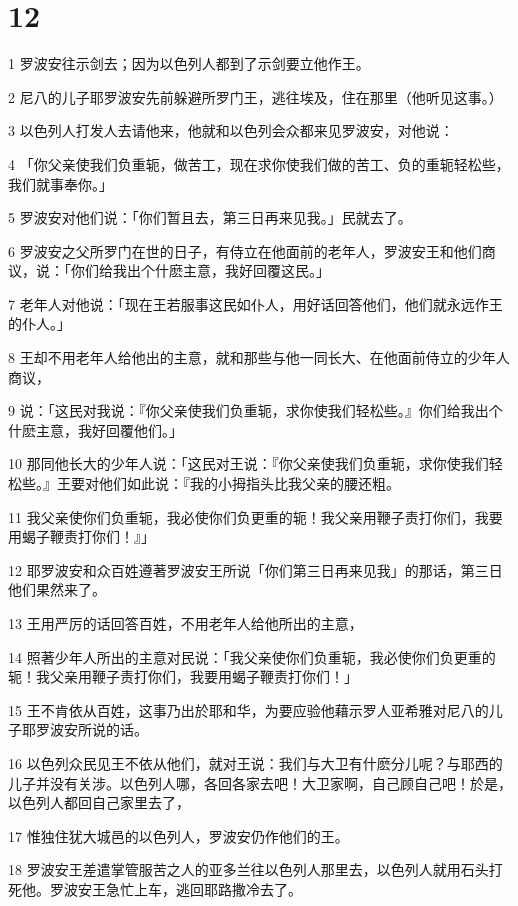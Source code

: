 \chapter{12}

\par 1 罗波安往示剑去；因为以色列人都到了示剑要立他作王。
\par 2 尼八的儿子耶罗波安先前躲避所罗门王，逃往埃及，住在那里（他听见这事。）
\par 3 以色列人打发人去请他来，他就和以色列会众都来见罗波安，对他说：
\par 4 「你父亲使我们负重轭，做苦工，现在求你使我们做的苦工、负的重轭轻松些，我们就事奉你。」
\par 5 罗波安对他们说：「你们暂且去，第三日再来见我。」民就去了。
\par 6 罗波安之父所罗门在世的日子，有侍立在他面前的老年人，罗波安王和他们商议，说：「你们给我出个什麽主意，我好回覆这民。」
\par 7 老年人对他说：「现在王若服事这民如仆人，用好话回答他们，他们就永远作王的仆人。」
\par 8 王却不用老年人给他出的主意，就和那些与他一同长大、在他面前侍立的少年人商议，
\par 9 说：「这民对我说：『你父亲使我们负重轭，求你使我们轻松些。』你们给我出个什麽主意，我好回覆他们。」
\par 10 那同他长大的少年人说：「这民对王说：『你父亲使我们负重轭，求你使我们轻松些。』王要对他们如此说：『我的小拇指头比我父亲的腰还粗。
\par 11 我父亲使你们负重轭，我必使你们负更重的轭！我父亲用鞭子责打你们，我要用蝎子鞭责打你们！』」
\par 12 耶罗波安和众百姓遵著罗波安王所说「你们第三日再来见我」的那话，第三日他们果然来了。
\par 13 王用严厉的话回答百姓，不用老年人给他所出的主意，
\par 14 照著少年人所出的主意对民说：「我父亲使你们负重轭，我必使你们负更重的轭！我父亲用鞭子责打你们，我要用蝎子鞭责打你们！」
\par 15 王不肯依从百姓，这事乃出於耶和华，为要应验他藉示罗人亚希雅对尼八的儿子耶罗波安所说的话。
\par 16 以色列众民见王不依从他们，就对王说：我们与大卫有什麽分儿呢？与耶西的儿子并没有关涉。以色列人哪，各回各家去吧！大卫家啊，自己顾自己吧！於是，以色列人都回自己家里去了，
\par 17 惟独住犹大城邑的以色列人，罗波安仍作他们的王。
\par 18 罗波安王差遣掌管服苦之人的亚多兰往以色列人那里去，以色列人就用石头打死他。罗波安王急忙上车，逃回耶路撒冷去了。
